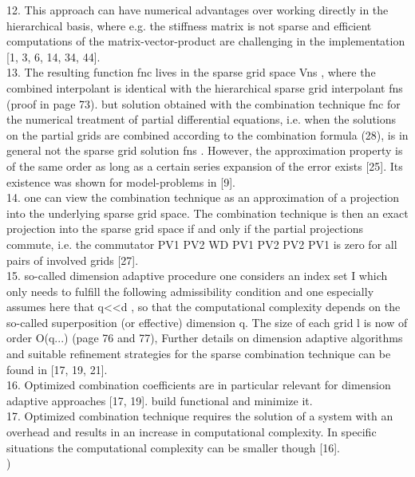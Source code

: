 12. This approach can have numerical advantages over working directly in the hierarchical basis, where e.g. the stiffness matrix is not sparse and efficient computations of the matrix-vector-product are challenging in the implementation [1, 3, 6, 14, 34, 44].\cite{Garcke2013}\\

13. The resulting function fnc lives in the sparse grid space Vns , where the combined interpolant is identical with the hierarchical sparse grid interpolant fns (proof in page 73). but solution obtained with the combination technique fnc for the numerical treatment of partial differential equations, i.e. when the solutions on the partial grids are combined according to the combination formula (28), is in general not the sparse grid solution fns . However, the approximation property is of the same order as long as a certain series expansion of the error exists [25]. Its existence was shown for model-problems in [9].\cite{Garcke2013}\\ %

14. one can view the combination technique as an approximation of a projection into the underlying sparse grid space. The combination technique is then an exact projection into the sparse grid space if and only if the partial projections commute, i.e. the commutator PV1  PV2   WD PV1 PV2   PV2 PV1 is zero for all pairs of involved grids [27].\cite{Garcke2013}\\

15. so-called dimension adaptive procedure one considers an index set I which only needs to fulfill the following admissibility condition and one especially assumes here that q<<d , so that the computational complexity depends on the so-called superposition (or effective) dimension q. The size of each grid l is now of order O(q...)  (page 76 and 77), Further details on dimension adaptive algorithms and suitable refinement strategies for the sparse combination technique can be found in [17, 19, 21]. \cite{Garcke2013}\\

16. Optimized combination coefficients are in particular relevant for dimension adaptive approaches [17, 19]. build functional and minimize it. \cite{Garcke2013}\\

17. Optimized combination technique requires the solution of a system with an overhead and results in an increase in computational complexity. In specific situations the computational complexity can be smaller though [16].\cite{Garcke2013}\\
)\\


